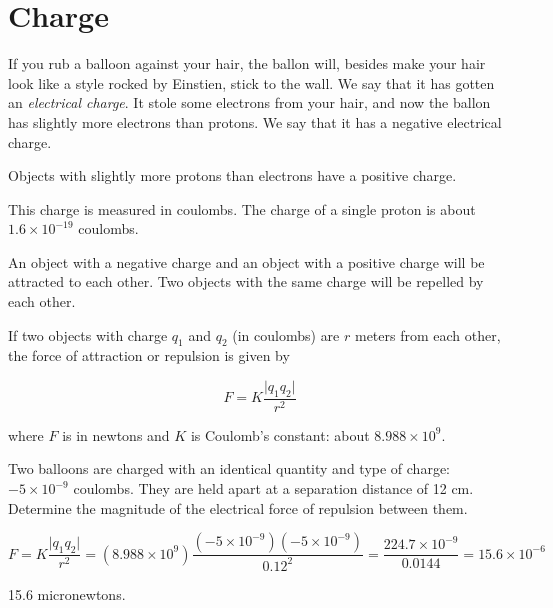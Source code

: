 \chapter{Charge}

If you rub a balloon against your hair,  the ballon will, besides make your hair look like a style rocked by Einstien, stick to the wall. We
say that it has gotten an \textit{electrical charge}. It stole some
electrons from your hair, and now the ballon has slightly more
electrons than protons. We say that it has a negative electrical
charge.

Objects with slightly more protons than electrons have a positive charge.

This charge is measured in coulombs. The charge of a single proton is
about $1.6 \times 10^{-19}$ coulombs.

An object with a negative charge and an object with a positive charge
will be attracted to each other. Two objects with the same charge will
be repelled by each other.

\begin{mdframed}[style=important, frametitle={Coulomb's Law}]

  If two objects with charge $q_1$ and $q_2$ (in coulombs) are $r$ meters from each other, the force of attraction or repulsion is given by

  $$F = K\frac{\lvert q_1 q_2 \rvert}{r^2}$$

    where $F$ is in newtons and $K$ is Coulomb's constant: about $8.988 \times 10^9$.
  
\end{mdframed}


\begin{Exercise}[title={Coulomb's Law}, label=charged_balloons]

Two balloons are charged with an identical quantity and type of
charge: $-5 \times 10^{-9}$ coulombs. They are held apart at a
separation distance of 12 cm. Determine the magnitude of the
electrical force of repulsion between them. 
  
\end{Exercise}
\begin{Answer}[ref=charged_balloons]

  $$F = K\frac{\lvert q_1 q_2 \rvert}{r^2} = (8.988 \times 10^9) \frac{(-5 \times 10^{-9})(-5 \times 10^{-9})}{0.12^2} = \frac{224.7 \times 10^{-9}}{0.0144} = 15.6 \times 10^{-6}$$

  15.6 micronewtons.
  
\end{Answer}

